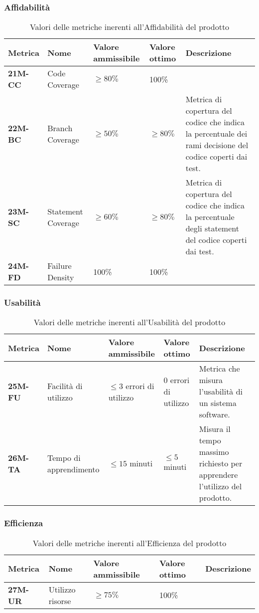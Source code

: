 \subsubsection{Affidabilità}
\begin{table}[h!]
	\centering
	\begin{tabularx}{\textwidth}{|X|X|X|X|X|} 	 
		\hline
		\textbf{Metrica} 	& \textbf{Nome} & \textbf{Valore ammissibile} & \textbf{Valore ottimo} & \textbf{Descrizione}\\  	 
		\hline
		\textbf{21M-CC} & Code Coverage & $\geq 80\% $  & 100\% &\\
		\hline
		\textbf{22M-BC} & Branch Coverage & $\geq 50\% $  & $\geq 80\% $ & Metrica di copertura del codice che indica la percentuale dei rami decisione del codice coperti dai test.\\ 
		\hline
		\textbf{23M-SC} & Statement Coverage & $\geq 60\% $ & $\geq 80\% $ & Metrica di copertura del codice che indica la percentuale degli statement del codice coperti dai test.\\ 
		\hline
		\textbf{24M-FD} & Failure Density & 100\%  & 100\%  &\\ 
		\hline
	\end{tabularx}
	\caption{ Valori delle metriche inerenti all'Affidabilità del prodotto}
	\label{table:8}
\end{table}
\subsubsection{Usabilità}
\begin{table}[h!]
	\centering
	\begin{tabularx}{\textwidth}{|X|X|X|X|X|} 	 
		\hline
		\textbf{Metrica} 	& \textbf{Nome} & \textbf{Valore ammissibile} & \textbf{Valore ottimo} & \textbf{Descrizione}\\  	 
		\hline
		\textbf{25M-FU} & Facilità di utilizzo & $\leq 3 $ errori di utilizzo & 0 errori di utilizzo & Metrica che misura l'usabilità di un sistema software.\\
		\hline
		\textbf{26M-TA} & Tempo di apprendimento & $\leq 15 $ minuti  & $\leq 5 $ minuti & Misura il tempo massimo richiesto per apprendere l'utilizzo del prodotto. \\ 
		\hline
	\end{tabularx}
	\caption{ Valori delle metriche inerenti all'Usabilità del prodotto}
	\label{table:9}
\end{table}
\subsubsection{Efficienza}
\begin{table}[h!]
	\centering
	\begin{tabularx}{\textwidth}{|X|X|X|X|X|} 	 
		\hline
		\textbf{Metrica} 	& \textbf{Nome} & \textbf{Valore ammissibile} & \textbf{Valore ottimo} & \textbf{Descrizione}\\  	 
		\hline
		\textbf{27M-UR} & Utilizzo risorse & $\geq 75\% $  & 100\% & \\
		\hline
	\end{tabularx}
	\caption{ Valori delle metriche inerenti all'Efficienza del prodotto}
	\label{table:10}
	\end{table}
